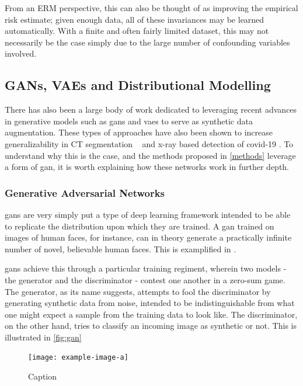From an ERM perspective, this can also be thought of as improving the empirical risk estimate; given enough data, all of these invariances may be learned automatically. With a finite and often fairly limited dataset, this may not necessarily be the case simply due to the large number of confounding variables involved. 

\subsection{GANs, VAEs and Distributional Modelling}

There has also been a large body of work dedicated to leveraging recent advances in generative models such as \glspl{gan} and \glspl{vae} to serve as synthetic data augmentation. These types of approaches have also been shown to increase generalizability in CT segmentation ~\cite{cyclegan} and x-ray based detection of covid-19 \cite{covid}. To understand why this is the case, and the methods proposed in \autoref{methods} leverage a form of \gls{gan}, it is worth explaining how these networks work in further depth.
    \subsubsection{Generative Adversarial Networks}
     \glspl{gan} are very simply put a type of deep learning framework intended to be able to replicate the distribution upon which they are trained. A \gls{gan} trained on images of human faces, for instance, can in theory generate a practically infinite number of novel, believable human faces. This is examplified in \cite{facegan}. 
     
     \glspl{gan} achieve this through a particular training regiment, wherein two models - the generator and the discriminator - contest one another in a zero-sum game. The generator, as its name suggests, attempts to fool the discriminator by generating synthetic data from noise, intended to be indistinguishable from what one might expect a sample from the training data to look like. The discriminator, on the other hand, tries to classify an incoming image as synthetic or not. This is illustrated in \autoref{fig:gan} 
     \begin{figure}
         \centering
         \texttt{[image: example-image-a]}
         \caption{Caption}
         \label{fig:gan}
     \end{figure}
     
